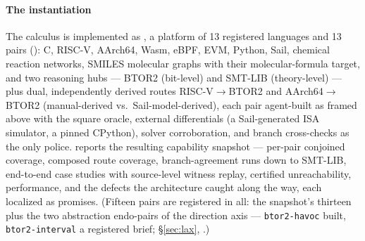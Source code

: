 \paragraph{The instantiation}
The calculus is implemented as \hg, a platform of 13 registered languages
and 13 pairs (): C, RISC-V, AArch64, Wasm, eBPF,
EVM, Python, Sail, chemical reaction networks, SMILES molecular graphs
with their molecular-formula target,
and two reasoning hubs --- BTOR2 (bit-level) and SMT-LIB (theory-level) ---
plus dual, independently derived routes RISC-V$\to$BTOR2 and
AArch64$\to$BTOR2 (manual-derived vs.\ Sail-model-derived), each pair
agent-built as framed above with the square oracle, external
differentials (a Sail-generated ISA simulator, a pinned CPython), solver
corroboration, and branch cross-checks as the only police.
 reports the resulting capability snapshot ---
per-pair conjoined coverage, composed route coverage, branch-agreement
runs down to SMT-LIB, end-to-end case studies with source-level witness
replay, certified unreachability, performance, and the defects the
architecture caught along the way, each localized as
 promises.\ifarxiv{} (Fifteen pairs are
registered in all: the snapshot's thirteen plus the two abstraction
endo-pairs of the direction axis --- \texttt{btor2-havoc} built,
\texttt{btor2-interval} a registered brief; \S\ref{sec:lax},
.)\fi{}

